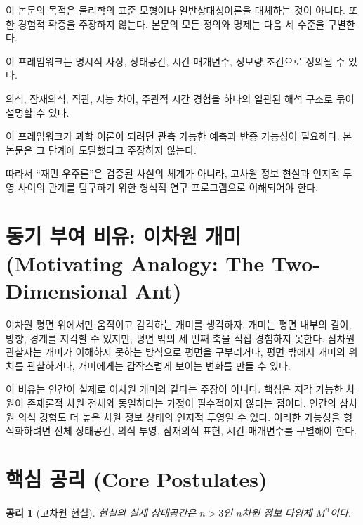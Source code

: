 \documentclass[11pt]{article}
\newtheorem{axiom}{공리}
\theoremstyle{remark}
\begin{document}
이 논문의 목적은 물리학의 표준 모형이나 일반상대성이론을 대체하는 것이
아니다. 또한 경험적 확증을 주장하지 않는다. 본문의 모든 정의와 명제는
다음 세 수준을 구별한다.

\begin{description}[leftmargin=2.8cm, style=nextline]
  \item[Level A: 수학적 가능성]
  이 프레임워크는 명시적 사상, 상태공간, 시간 매개변수, 정보량 조건으로
  정의될 수 있다.

  \item[Level B: 해석적 이론]
  의식, 잠재의식, 직관, 지능 차이, 주관적 시간 경험을 하나의 일관된 해석
  구조로 묶어 설명할 수 있다.

  \item[Level C: 경험 과학]
  이 프레임워크가 과학 이론이 되려면 관측 가능한 예측과 반증 가능성이
  필요하다. 본 논문은 그 단계에 도달했다고 주장하지 않는다.
\end{description}

따라서 ``재민 우주론''은 검증된 사실의 체계가 아니라, 고차원 정보 현실과
인지적 투영 사이의 관계를 탐구하기 위한 형식적 연구 프로그램으로 이해되어야
한다.

\section{동기 부여 비유: 이차원 개미 (Motivating Analogy: The Two-Dimensional Ant)}

이차원 평면 위에서만 움직이고 감각하는 개미를 생각하자. 개미는 평면
내부의 길이, 방향, 경계를 지각할 수 있지만, 평면 밖의 세 번째 축을 직접
경험하지 못한다. 삼차원 관찰자는 개미가 이해하지 못하는 방식으로 평면을
구부리거나, 평면 밖에서 개미의 위치를 관찰하거나, 개미에게는 갑작스럽게
보이는 변화를 만들 수 있다.

이 비유는 인간이 실제로 이차원 개미와 같다는 주장이 아니다. 핵심은
지각 가능한 차원이 존재론적 차원 전체와 동일하다는 가정이 필수적이지
않다는 점이다. 인간의 삼차원 의식 경험도 더 높은 차원 정보 상태의
인지적 투영일 수 있다. 이러한 가능성을 형식화하려면 전체 상태공간,
의식 투영, 잠재의식 표현, 시간 매개변수를 구별해야 한다.

\section{핵심 공리 (Core Postulates)}

\begin{axiom}[고차원 현실]
현실의 실제 상태공간은 $n>3$인 $n$차원 정보 다양체 $M^n$이다.
\end{axiom}
\end{document}
